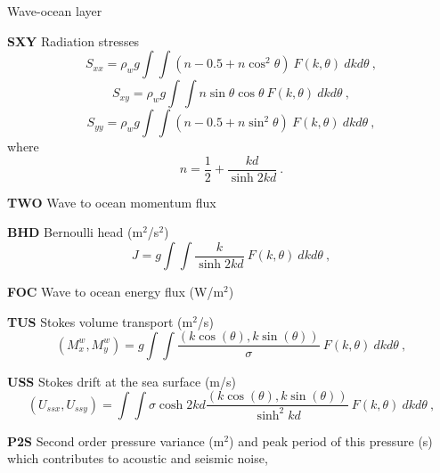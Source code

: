 \begin{list}{)\hfill}
\item{Wave-ocean layer}

\begin{list}{)\hfill}
            { \leftmargin 8mm 
             \rightmargin 0mm \itemsep 0mm \parsep 0mm}
\item \textbf{SXY} Radiation stresses
      \begin{equation} S_{xx} = \rho_w g \int \!\!\!\! \int \left
        ( n - 0.5 + n \cos^2 \theta \right )  \: F(k,\theta) \: dk d\theta
      \: , \label{eq:Sxx} \end{equation}
      \begin{equation} S_{xy} =\rho_w g \int \!\!\!\! \int
        n \sin \theta \cos \theta  \: F(k,\theta) \: dk d\theta
      \: , \label{eq:Syy} \end{equation}
      \begin{equation} S_{yy} =\rho_w g \int \!\!\!\! \int \left
        ( n - 0.5 + n \sin^2 \theta \right )  \: F(k,\theta) \: dk d\theta
      \: , \label{eq:Sxy} \end{equation}
      where
      \begin{equation} n = \frac{1}{2} + \frac{kd}{\sinh 2kd}
      \: . \label{eq:n} \end{equation}
\item \textbf{TWO} Wave to ocean momentum flux
\item \textbf{BHD} Bernoulli head (m$^2$/s$^2$)
      \begin{equation} J =  g \int \!\!\!\! \int  \frac{k}
        {\sinh 2kd}  \: F(k,\theta) \: dk d\theta
      \: , \label{eq:BHD} \end{equation}
\item \textbf{FOC} Wave to ocean energy flux (W/m$^2$)
\item \textbf{TUS} Stokes volume transport (m$^2$/s)
     \begin{equation} (M^w_x,M^w_y) =  g \int \!\!\!\! \int  \frac{(k \cos(\theta),k \sin(\theta))}
        {\sigma}  \: F(k,\theta) \: dk d\theta
      \: , \label{eq:Mw} \end{equation}
\item \textbf{USS} Stokes drift at the sea surface (m/s)
     \begin{equation} (U_{ssx},U_{ssy}) =  \int \!\!\!\! \int  \sigma \cosh 2kd \frac{(k \cos(\theta),k \sin(\theta))}
        {\sinh^2 kd}  \: F(k,\theta) \: dk d\theta
      \: , \label{eq:Uss} \end{equation}
\item \textbf{P2S} Second order pressure variance (m$^2$) and peak period of this pressure (s) which contributes to acoustic and seismic noise, 

\end{list}
\end{list}
